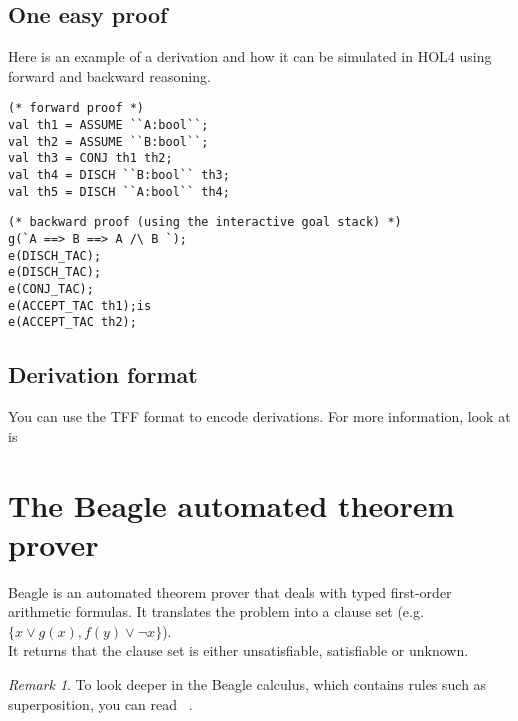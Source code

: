 \documentclass[a4paper, 11pt]{article}
\theoremstyle{plain}
\theoremstyle{definition}
\theoremstyle{remark}
\newtheorem*{remark}{Remark}
\begin{document}
\subsection{One easy proof}
Here is an example of a derivation and how it can be simulated in HOL4 using forward and backward reasoning.

\begin{prooftree}
\end{prooftree}

\scriptsize
\begin{Verbatim}[frame=single]
(* forward proof *)
val th1 = ASSUME ``A:bool``;
val th2 = ASSUME ``B:bool``;
val th3 = CONJ th1 th2;
val th4 = DISCH ``B:bool`` th3;
val th5 = DISCH ``A:bool`` th4;
\end{Verbatim} 
\begin{Verbatim}[frame=single]
(* backward proof (using the interactive goal stack) *)
g(`A ==> B ==> A /\ B `);
e(DISCH_TAC);
e(DISCH_TAC);
e(CONJ_TAC);
e(ACCEPT_TAC th1);is
e(ACCEPT_TAC th2);
\end{Verbatim} 
\normalsize

\subsection{Derivation format}
You can use the TFF format to encode derivations. For more information, look at is

\section{The Beagle automated theorem prover}
Beagle is an automated theorem prover that deals with typed first-order arithmetic formulas. It translates the problem into a clause set (e.g. $\lbrace x \vee g(x), f(y) \vee \neg x \rbrace$).
\\It returns that the clause set is either unsatisfiable, satisfiable or unknown.

\begin{remark}
To look deeper in the Beagle calculus, which contains rules such as superposition, you can read ~\cite{Waldmann13}.
\end{remark}
\end{document}
